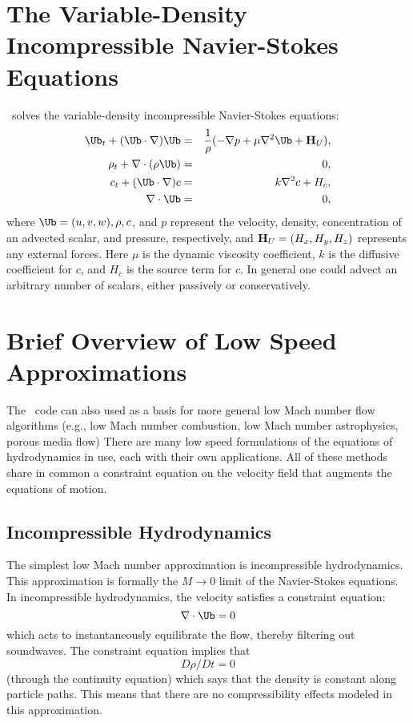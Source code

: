 \section{The Variable-Density Incompressible Navier-Stokes Equations}

\iamr\ solves the variable-density incompressible Navier-Stokes equations:
\begin{eqnarray}
\Ub_t + (\Ub\cdot\nabla)\Ub &=& \frac{1}{\rho}(-\nabla p + \mu\nabla^2 \Ub + {\bf H}_U), \\
\rho_t + \nabla\cdot(\rho \Ub) &=& 0, \\
c_t + (\Ub\cdot\nabla)c &=& k\nabla^2 c + H_c, \\
\nabla\cdot \Ub &=& 0,
\end{eqnarray}
where $\Ub = (u, v, w), \rho, c$, and $p$ represent the velocity, density, concentration of an 
advected scalar, and pressure, respectively, and ${\bf H}_U = (H_x , H_y , H_z )$ represents any external
forces. Here $\mu$ is the dynamic viscosity coefficient, $k$ is the diffusive coefficient for $c$, and
$H_c$ is the source term for $c$. In general one could advect an arbitrary number of scalars,
either passively or conservatively.

\section{Brief Overview of Low Speed Approximations}

The \iamr\ code can also used as a basis for more
general low Mach number flow algorithms (e.g., low Mach number combustion,
low Mach number astrophysics, porous media flow)
There are many low speed formulations of the equations of hydrodynamics
in use, each with their own applications.  All of these methods share in
common a constraint equation on the velocity field that augments the
equations of motion.  

\subsection{Incompressible Hydrodynamics}

The simplest low Mach number approximation is incompressible
hydrodynamics. This approximation is formally the $M \rightarrow 0$
limit of the Navier-Stokes equations. In incompressible hydrodynamics,
the velocity satisfies a constraint equation:
\begin{equation}
\nabla \cdot \Ub = 0
\end{equation}
which acts to instantaneously equilibrate the flow, thereby filtering
out soundwaves.  The constraint equation implies that
\begin{equation}
D\rho/Dt = 0
\end{equation}
(through the continuity equation) which says that the density is
constant along particle paths. This means that there are no
compressibility effects modeled in this approximation.

